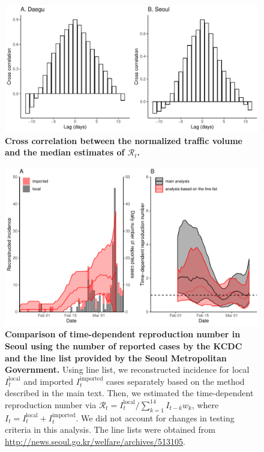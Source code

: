 \pagebreak

\begin{figure}[!ht]
\includegraphics[width=\textwidth]{figure_cross.pdf}
\caption{
\textbf{Cross correlation between the normalized traffic volume and the median estimates of $\mathcal R_t$.}
}
\end{figure}

\pagebreak

\begin{figure}[!ht]
\includegraphics[width=\textwidth]{figure_R_t_seoul_linelist.pdf}
\caption{
\textbf{Comparison of time-dependent reproduction number in Seoul using the number of reported cases by the KCDC and the line list provided by the Seoul Metropolitan Government.}
Using line list, we reconstructed incidence for local $I_t^{\textrm{local}}$ and imported $I_t^{\textrm{imported}}$ cases separately based on the method described in the main text. Then, we estimated the time-dependent reproduction number via $\mathcal R_t = I_t^{\textrm{local}}/\sum_{k=1}^{14} I_{t-k} w_k$, where $I_t=I_t^{\textrm{local}}+I_t^{\textrm{imported}}$. We did not account for changes in testing criteria in this analysis.
The line lists were obtained from \url{http://news.seoul.go.kr/welfare/archives/513105}.
}
\end{figure}
